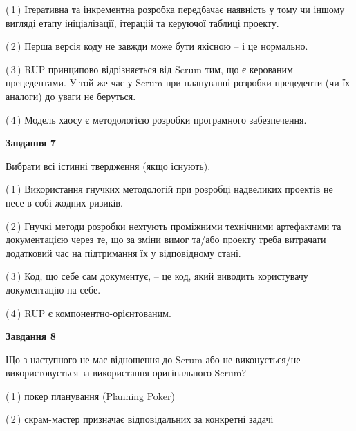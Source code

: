 \documentclass[10pt, ukrainian]{article}
\begin{document}
{\begin {large}
(\,1\,) Ітеративна та інкрементна розробка передбачає наявність у тому чи іншому вигляді етапу ініціалізації, ітерацій та керуючої таблиці проекту. %



(\,2\,) Перша версія коду не завжди може бути якісною -- і це нормально. %



(\,3\,) RUP принципово відрізняється від Scrum тим, що є керованим прецедентами. У той же час у Scrum при плануванні розробки прецеденти (чи їх аналоги) до уваги не беруться. %



(\,4\,) Модель хаосу є методологією розробки програмного забезпечення. %


{\begin {center}\textbf{Завдання 7}\end {center}}\par
Вибрати всі істинні твердження (якщо існують).\par
\vspace{2mm}



(\,1\,) Використання гнучких методологій при розробці надвеликих проектів не несе в собі жодних ризиків. %



(\,2\,) Гнучкі методи розробки нехтують проміжними технічними артефактами та документацією через те, що за зміни вимог та/або проекту треба витрачати додатковий час на підтримання їх у відповідному стані. %



(\,3\,) Код, що себе сам документує, -- це код, який виводить користувачу документацію на себе. %



(\,4\,) RUP є компонентно-орієнтованим. %


{\begin {center}\textbf{Завдання 8}\end {center}}\par
Що з наступного не має відношення до Scrum або не виконується/не використовується за використання оригінального Scrum?\par
\vspace{2mm}



(\,1\,) покер планування (Planning Poker)%



(\,2\,) скрам-мастер призначає відповідальних за конкретні задачі%




\end{large}}
\end{document}
